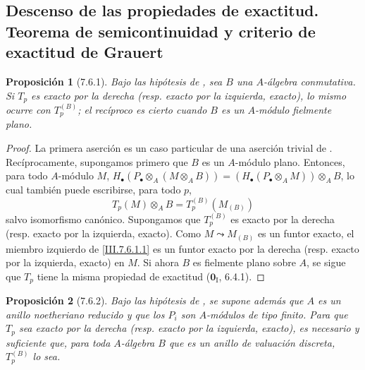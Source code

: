 \documentclass[10pt,oneside,openany]{book}
\theoremstyle{egaenv}\newtheorem*{env}{---}
\theoremstyle{egastatement}
\newtheorem*{proposition}{Proposición}
\theoremstyle{egadescription}
\begin{document}
\subsection{Descenso de las propiedades de exactitud. Teorema de
semicontinuidad y criterio de exactitud de Grauert}
\label{subsection:III.7.6}
\label{subsection:III.7.6.fr}
\label{III.7.6}

\begin{proposition}[7.6.1]
\label{III.7.6.1}
Bajo las hipótesis de , sea $B$ una $A$-álgebra
conmutativa. Si $T_p$ es exacto por la derecha (resp.
exacto por la izquierda, exacto), lo mismo ocurre con $T_p^{(B)}$;
el recíproco es cierto cuando $B$ es un $A$-módulo fielmente plano.
\end{proposition}

\begin{proof}
La primera aserción es un caso particular de una aserción trivial de
. Recíprocamente, supongamos primero que $B$ es un
$A$-módulo plano. Entonces, para todo $A$-módulo $M$,
$H_\bullet(P_\bullet\otimes_A(M\otimes_A B))=(H_\bullet(P_\bullet\otimes_A M))\otimes_A B$,
lo cual también puede escribirse, para todo $p$,
\[
  T_p(M)\otimes_A B
  =
  T_p^{(B)}(M_{(B)})
  \tag{7.6.1.1}\label{III.7.6.1.1.fr}
\]
salvo isomorfismo canónico. Supongamos que $T_p^{(B)}$ es exacto por
la derecha (resp. exacto por la izquierda, exacto). Como
$M\leadsto M_{(B)}$ es un funtor exacto, el miembro izquierdo de
\eqref{III.7.6.1.1} es un funtor exacto por la derecha
(resp. exacto por la izquierda, exacto) en $M$. Si ahora
$B$ es fielmente plano sobre $A$, se sigue que $T_p$ tiene la misma propiedad de exactitud ($\mathbf{0}_{\mathrm I}$, 6.4.1).
\end{proof}

\begin{proposition}[7.6.2]
\label{III.7.6.2}
Bajo las hipótesis de , se supone además que $A$ es
un anillo noetheriano reducido y que los $P_i$ son $A$-módulos de
tipo finito. Para que $T_p$ sea exacto por la derecha \textup{(resp.} exacto por la izquierda, exacto), es necesario y suficiente
que, para toda $A$-álgebra $B$ que es un anillo de valuación discreta,
$T_p^{(B)}$ lo sea.
\end{proposition}
\end{document}
